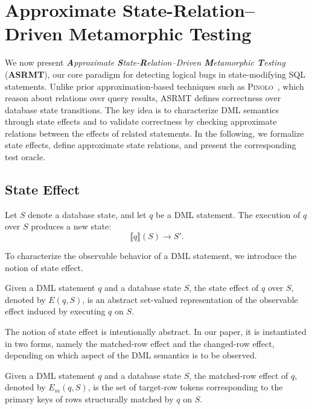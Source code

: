 \section{Approximate State-Relation–Driven Metamorphic Testing}
\label{sec:asrmt}

We now present \textit{\textbf{A}pproximate \textbf{S}tate-\textbf{R}elation–Driven \textbf{M}etamorphic \textbf{T}esting} (\textbf{ASRMT}), our core paradigm for detecting logical bugs in state-modifying SQL statements. 
Unlike prior approximation-based techniques such as \textsc{Pinolo}~\cite{hao2023pinolo}, which reason about relations over query results, ASRMT defines correctness over database state transitions. 
The key idea is to characterize DML semantics through state effects and to validate correctness by checking approximate relations between the effects of related statements. 
In the following, we formalize state effects, define approximate state relations, and present the corresponding test oracle.

\subsection{State Effect}

Let $S$ denote a database state, and let $q$ be a DML statement. The execution of $q$ over $S$ produces a new state:
\[
\llbracket q \rrbracket(S) \rightarrow S'.
\]

To characterize the observable behavior of a DML statement, we introduce the notion of state effect.

\begin{definition}
	Given a DML statement $q$ and a database state $S$, the state effect of $q$ over $S$, denoted by $E(q,S)$, is an abstract set-valued representation of the observable effect induced by executing $q$ on $S$.
\end{definition}

The notion of state effect is intentionally abstract. In our paper, it is instantiated in two forms, namely the matched-row effect and the changed-row effect, depending on which aspect of the DML semantics is to be observed.

\begin{definition}
	Given a DML statement $q$ and a database state $S$, the matched-row effect of $q$, denoted by $E_m(q,S)$, is the set of target-row tokens corresponding to the primary keys of rows structurally matched by $q$ on $S$.
\end{definition}


